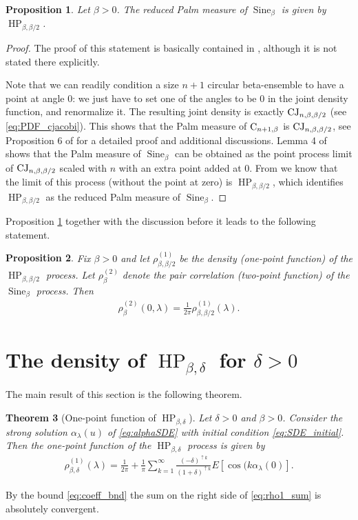 \documentclass[12pt]{article}
\newtheorem{theorem}{Theorem}
\newtheorem{proposition}[theorem]{Proposition}
\theoremstyle{definition} %
\theoremstyle{remark} %
\newcommand{\Sineb}{\operatorname{Sine}_{\beta}}
\newcommand{\HPb}{\operatorname{HP}_{\beta, \delta}}
\newcommand{\HPbb}{\operatorname{HP}_{\beta, \beta/2}}
\begin{document}
\begin{proposition}\label{prop:Palm}
Let $\beta>0$.   The reduced Palm measure of $\Sineb$ is given by $\HPbb$.
\end{proposition}
\begin{proof}
The proof of this statement is basically contained in \cite{BVBV_Palm}, although it is not stated there explicitly. 


Note that we can readily condition a size $n+1$ circular beta-ensemble to have a point at angle 0: we just have to set one of the angles to be 0 in the joint density function, and renormalize it. The resulting joint density is exactly $\textup{CJ}_{n,\beta,\beta/2}$ (see \eqref{eq:PDF_cjacobi}).
This shows that the Palm measure of $\textup{C}_{n+1,\beta}$ is $\textup{CJ}_{n,\beta,\beta/2}$, see Proposition 6 of \cite{BVBV_Palm} for a detailed proof and additional discussions. 
Lemma 4 of \cite{BVBV_Palm}  shows that the Palm measure of  $\Sineb$ can be obtained as the point process limit of $\textup{CJ}_{n,\beta,\beta/2}$ scaled with $n$ with an extra point added at 0. From \cite{LV_HP}  we know that the limit of this process (without the point at zero) is  $\HPbb$, which identifies $\HPbb$ as the reduced Palm measure of $\Sineb$.
\end{proof}



Proposition \ref{prop:Palm} together with the discussion before it leads to the following statement.
\begin{proposition}\label{prop:sine_HP}
    Fix $\beta>0$ and let $\rho_{\beta,\beta/2}^{(1)}$ be the density (one-point function) of the  $\HPbb$ process. Let $\rho_{\beta}^{(2)}$ denote the pair correlation (two-point function) of the  $\Sineb$ process. Then
    \begin{align}
        \rho_{\beta}^{(2)}(0,\lambda)=\frac{1}{2\pi} \rho_{\beta,\beta/2}^{(1)}(\lambda).\label{eq:sine_HP}
    \end{align}
\end{proposition}




\section{The density of $\HPb$ for $\delta>0$}
\label{sec:1point}

The main result of this section is the following theorem. 

\begin{theorem}[One-point function of $\HPb$]\label{thm:1p_HP}
 Let $\delta>0$ and $\beta>0$. 
Consider the strong solution $\alpha_\lambda(u)$ of \eqref{eq:alphaSDE} with initial condition \eqref{eq:SDE_initial}. Then the one-point function of the $\HPb$ process is given by 
    \begin{align}\label{eq:rho1_sum}
        \rho^{(1)}_{\beta,\delta}(\lambda)=\frac{1}{2\pi}+\frac{1}{\pi}\sum_{k=1}^\infty  \frac{(-\delta)^{\uparrow k}}{(1+\delta)^{\uparrow k}} E[\cos(k \alpha_\lambda(0)]. 
    \end{align}
\end{theorem}
By the bound \eqref{eq:coeff_bnd} the sum on the right side of \eqref{eq:rho1_sum} is absolutely convergent.
\end{document}
